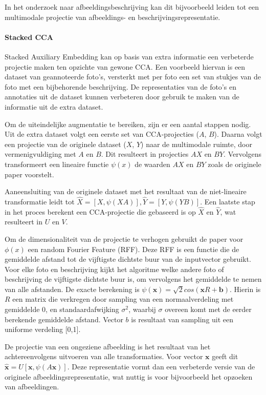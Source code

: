 In het onderzoek naar afbeeldingsbeschrijving kan dit bijvoorbeeld leiden tot een multimodale projectie van afbeeldings- en beschrijvingsrepresentatie.

\paragraph{Stacked CCA}

Stacked Auxiliary Embedding\cite{Gong2014} kan op basis van extra informatie een verbeterde projectie maken ten opzichte van gewone CCA. Een voorbeeld hiervan is een dataset van geannoteerde foto's, versterkt met per foto een set van stukjes van de foto met een bijbehorende beschrijving. De representaties van de foto's en annotaties uit de dataset kunnen verbeteren door gebruik te maken van de informatie uit de extra dataset.

Om de uiteindelijke augmentatie te bereiken, zijn er een aantal stappen nodig. Uit de extra dataset volgt een eerste set van CCA-projecties ($A$, $B$). Daarna volgt een projectie van de originele dataset ($X$, $Y$) naar de multimodale ruimte, door vermenigvuldiging met $A$ en $B$. Dit resulteert in projecties $AX$ en $BY$. Vervolgens transformeert een lineaire functie $\psi(x)$ de waarden $AX$ en $BY$ zoals de originele paper voorstelt.

Aaneensluiting van de originele dataset met het resultaat van de niet-lineaire transformatie leidt tot $\hat{X} = [X, \psi(XA)], \hat{Y} = [Y, \psi(YB)]$. Een laatste stap in het proces berekent een CCA-projectie die gebaseerd is op $\hat{X}$ en $\hat{Y}$, wat resulteert in $U$ en $V$.

Om de dimensionaliteit van de projectie te verhogen gebruikt de paper voor $\phi(x)$ een random Fourier Feature (RFF). Deze RFF is een functie die de gemiddelde afstand tot de vijftigste dichtste buur van de inputvector gebruikt. Voor elke foto en beschrijving kijkt het algoritme welke andere foto of beschrijving de vijftigste dichtste buur is, om vervolgens het gemiddelde te nemen van alle afstanden. De exacte berekening is $\psi(\mathbf{x})=\sqrt{2}cos(\mathbf{x}R+\mathbf{b})$. Hierin is $R$ een matrix die verkregen door sampling van een normaalverdeling met gemiddelde 0, en standaardafwijking $\sigma^2$, waarbij $\sigma$ overeen komt met de eerder berekende gemiddelde afstand. Vector $b$ is resultaat van sampling uit een uniforme verdeling [0,1].

De projectie van een ongeziene afbeelding is het resultaat van het achtereenvolgens uitvoeren van alle transformaties. Voor vector $\mathbf{x}$ geeft dit $\mathbf{\hat{x}} = U[\mathbf{x}, \psi(A\mathbf{x})]$. Deze representatie vormt dan een verbeterde versie van de originele afbeeldingsrepresentatie, wat nuttig is voor bijvoorbeeld het opzoeken van afbeeldingen.
